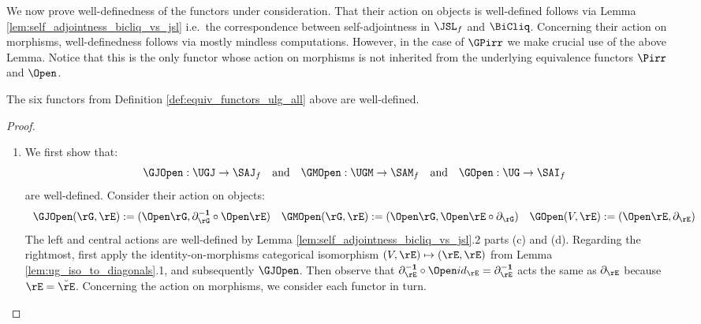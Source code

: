 \documentclass{article}
\begin{document}
\smallskip
We now prove well-definedness of the functors under consideration. That their action on objects is well-defined follows via Lemma \ref{lem:self_adjointness_bicliq_vs_jsl} i.e.\ the correspondence between self-adjointness in $\JSL_f$ and $\BiCliq$. Concerning their action on morphisms, well-definedness follows via mostly mindless computations. However, in the case of $\GPirr$ we make crucial use of the above Lemma. Notice that this is the only functor whose action on morphisms is not inherited from the underlying equivalence functors $\Pirr$ and $\Open$.
\smallskip

\begin{lemma}
The six functors from Definition \ref{def:equiv_functors_ulg_all} above are well-defined.
\end{lemma}

\begin{proof}
\item
\begin{enumerate}
\item
We first show that:
\[
\GJOpen : \UGJ \to \SAJ_f
\quad\text{and}\quad
\GMOpen : \UGM \to \SAM_f
\quad\text{and}\quad
\GOpen : \UG \to \SAI_f
\]
are well-defined. Consider their action on objects:
\[
\begin{tabular}{c}
$\GJOpen (\rG,\rE)
:= (\Open\rG, \partial_\rG^{\bf-1} \circ \Open\rE)
\quad
\GMOpen (\rG,\rE) 
:= (\Open\rG, \Open\rE \circ \partial_\rG)
\quad
\GOpen(V,\rE) := (\Open\rE, \partial_\rE)$
\end{tabular}
\]
The left and central actions are well-defined by Lemma \ref{lem:self_adjointness_bicliq_vs_jsl}.2 parts (c) and (d). Regarding the rightmost, first apply the identity-on-morphisms categorical isomorphism $(V,\rE) \mapsto (\rE,\rE)$ from Lemma \ref{lem:ug_iso_to_diagonals}.1, and subsequently $\GJOpen$. Then observe that $\partial_\rE^{\bf-1} \circ \Open id_\rE = \partial_\rE^{\bf-1}$ acts the same as $\partial_\rE$ because $\rE = \breve{\rE}$. Concerning the action on morphisms, we consider each functor in turn.


\end{enumerate}
\end{proof}
\end{document}
